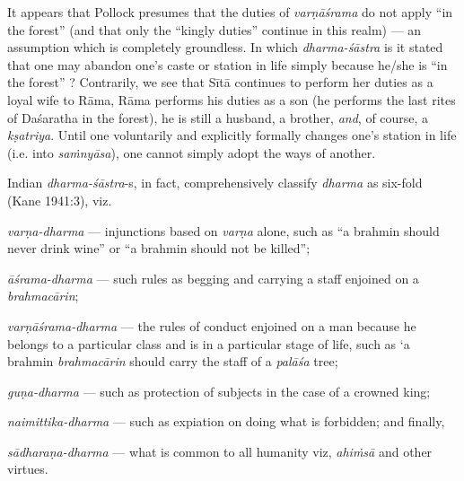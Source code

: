 It appears that Pollock presumes that the duties of {\sl varṇāśrama} do not apply “in the forest” (and that only the “kingly duties” continue in this realm) --- an assumption which is completely groundless. In which {\sl dharma-śāstra} is it stated that one may abandon one’s caste or station in life simply because he/she is “in the forest” ? Contrarily, we see that Sītā continues to perform her duties as a loyal wife to Rāma, Rāma performs his duties as a son (he performs the last rites of Daśaratha in the forest), he is still a husband, a brother, {\sl and}, of course, a {\sl kṣatriya}. Until one voluntarily and explicitly formally changes one’s station in life (i.e. into {\sl saṁnyāsa}), one cannot simply adopt the ways of another. 

Indian {\sl dharma-śāstra}-s, in fact, comprehensively classify {\sl dharma} as six-fold (Kane 1941:3), viz. 

{\sl varṇa-dharma}
 --- injunctions based on {\sl varṇa} alone, such as “a brahmin should never drink wine” or “a brahmin should not be killed”; 

{\sl āśrama-dharma}  --- such rules as begging and carrying a staff enjoined on a {\sl brahmacārin};
  
{\sl varṇāśrama-dharma} --- the rules of conduct enjoined on a man because he belongs to a particular class and is in a particular stage of life, such as ‘a brahmin {\sl brahmacārin} should carry the staff of a {\sl palāśa} tree; 

{\sl guṇa-dharma} --- such as protection of subjects in the case of a crowned king; 

{\sl naimittika-dharma} --- such as expiation on doing what is forbidden; and finally, 

{\sl sādharaṇa-dharma} --- what is common to all humanity viz, {\sl ahiṁsā} and other virtues.
 
